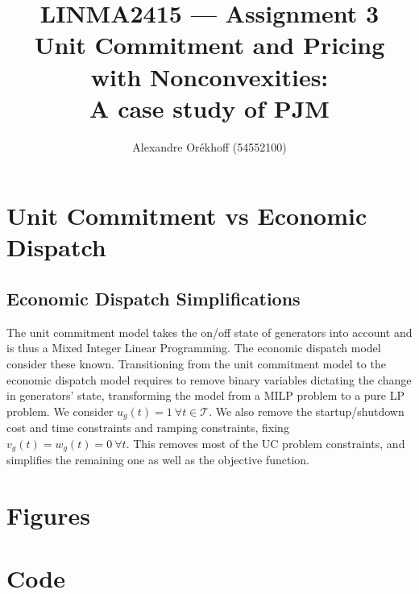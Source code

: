 \documentclass[
	a4paper,
	10pt,
	unnumberedsections,
	twoside,
]{LTJournalArticle}
\title{LINMA2415 --- Assignment 3 \\ Unit Commitment and Pricing with Nonconvexities:\\ A case study of PJM}
\author{%
	Alexandre Orékhoff (54552100)
}
\begin{document}
\maketitle


\section{Unit Commitment vs Economic Dispatch}

\subsection{Economic Dispatch Simplifications}

The unit commitment model takes the on/off state of generators into account and is thus a Mixed Integer Linear Programming. The economic dispatch model consider these known. Transitioning from the unit commitment model to the economic dispatch model requires to remove binary variables dictating the change in generators' state, transforming the model from a MILP problem to a pure LP problem. We consider $u_g(t)=1\ \forall t\in\mathcal T$. We also remove the startup/shutdown cost and time constraints and ramping constraints, fixing $v_g(t)=w_g(t)=0\ \forall t$. This removes most of the UC problem constraints, and simplifies the remaining one as well as the objective function.





\newpage
\onecolumn
\appendix

\section{Figures}

\begin{figure}[!ht]
    \centering
    \caption{}
\end{figure}

\section{Code}

\begin{lstlisting}[language=Python, caption=Data loading and preprocessing]
\end{lstlisting}
\end{document}
